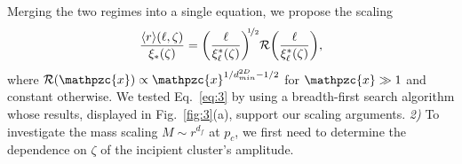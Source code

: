 \documentclass[aps, groupedaddress, superscriptaddress, prl, reprint]{revtex4-1}
\begin{document}
Merging the two regimes into a single equation, we propose the scaling
\begin{equation}\label{eq:3}
\frac{\langle r\rangle(\ell,\zeta)}{\xi_*(\zeta)}=\bigg(\frac{\ell}{\xi_\ell^*(\zeta)}\bigg)^{\!\!\nicefrac{1}{2}}\mathcal{R}\bigg(\frac{\ell}{\xi_\ell^*(\zeta)}\bigg),
\end{equation}
\noindent 
where $\mathcal{R}(\mathpzc{x})\propto\mathpzc{x}^{1/{d_{min}^{2D}}-1/2}$ for $\mathpzc{x}\gg1$ and constant otherwise. 
We tested Eq.~\eqref{eq:3} by using a breadth-first search algorithm whose results, displayed in Fig.~\ref{fig:3}(a), support our scaling arguments. 
\emph{2)} To investigate the mass scaling $M\sim r^{d_f}$ at $p_c$, we first need to determine the dependence on $\zeta$ of the incipient cluster's amplitude. 
\end{document}
